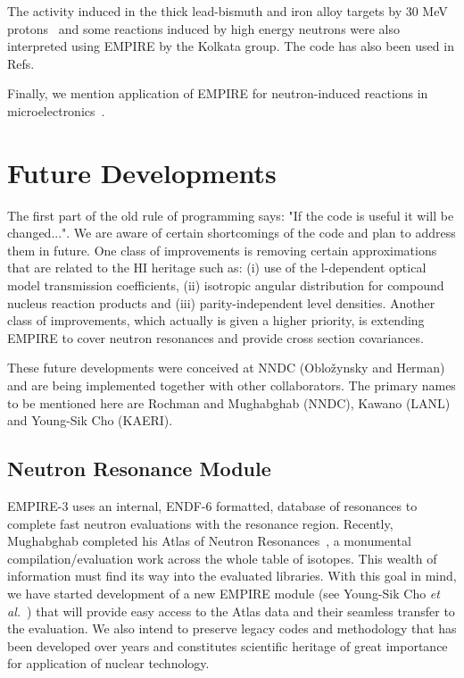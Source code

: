 The activity induced in the thick lead-bismuth and iron alloy targets by 30
MeV protons~\cite{Nandy:07a} and some reactions induced by high energy
neutrons were also interpreted using EMPIRE by the Kolkata group. The code
has also been used in Refs.~\cite{Said:06, Elmaghraby:06, Pandey:07}

Finally, we mention application of EMPIRE for neutron-induced reactions in
microelectronics~\cite{wrobel2005unc}.

\section{Future Developments}

The first part of the old rule of programming says: "If the code is useful
it will be changed...". We are aware of certain shortcomings of the code
and plan to address them in future. One class of improvements is removing
certain approximations that are related to the HI heritage such as: (i) use
of the l-dependent optical model transmission coefficients, (ii) isotropic
angular distribution for compound nucleus reaction products and (iii)
parity-independent level densities. Another class of improvements, which
actually is given a higher priority, is extending EMPIRE to cover neutron
resonances and provide cross section covariances.

These future developments were conceived at NNDC (Oblo\v{z}ynsky and Herman)
and are being implemented together with other collaborators. The primary
names to be mentioned here are Rochman and Mughabghab (NNDC), Kawano (LANL)
and Young-Sik Cho (KAERI).

\subsection{Neutron Resonance Module}

EMPIRE-3 uses an internal, ENDF-6 formatted, database of resonances to
complete fast neutron evaluations with the resonance region. Recently,
Mughabghab completed his Atlas of Neutron Resonances~\cite{Mughabghab:06}, a
monumental compilation/evaluation work across the whole table of isotopes.
This wealth of information must find its way into the evaluated libraries.
With this goal in mind, we have started development of a new EMPIRE module
(see Young-Sik Cho \textit{et al.}~\cite{Cho:07}) that will provide easy
access to the Atlas data and their seamless transfer to the evaluation. We
also intend to preserve legacy codes and methodology that has been developed
over years and constitutes scientific heritage of great importance for
application of nuclear technology.

